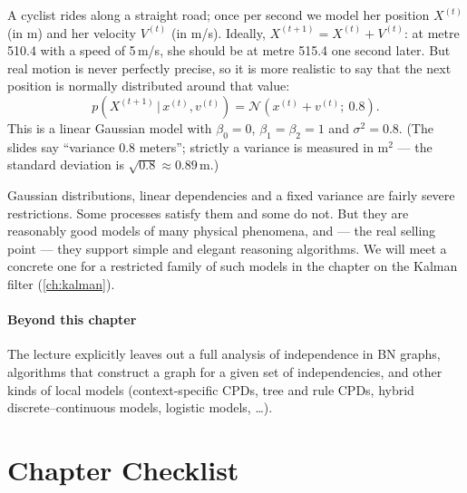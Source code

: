 \documentclass[11pt, oneside]{book}
\newcommand{\Prob}{\mathbb{P}}           %
\newcommand{\Normal}{\mathcal{N}}
\newcommand{\given}{\,\vert\,}           %
\let\originalsection\section
\renewcommand{\section}{\Needspace{7\baselineskip}\originalsection}
\begin{document}
\begin{exbox}[title={A bicycle on a straight road}]
A cyclist rides along a straight road; once per second we model her position
$X^{(t)}$ (in m) and her velocity $V^{(t)}$ (in m/s). Ideally,
$X^{(t+1)} = X^{(t)} + V^{(t)}$: at metre 510.4 with a speed of 5\,m/s, she
should be at metre 515.4 one second later. But real motion is never perfectly
precise, so it is more realistic to say that the next position is normally
distributed around that value:
\[
p(X^{(t+1)} \given x^{(t)}, v^{(t)}) = \Normal(x^{(t)} + v^{(t)};\ 0.8).
\]
This is a linear Gaussian model with $\beta_0 = 0$, $\beta_1 = \beta_2 = 1$ and
$\sigma^2 = 0.8$. (The slides say ``variance 0.8 meters''; strictly a variance
is measured in m$^2$ --- the standard deviation is $\sqrt{0.8} \approx
0.89$\,m.)
\end{exbox}

Gaussian distributions, linear dependencies and a fixed variance are fairly
severe restrictions. Some processes satisfy them and some do not. But they are
reasonably good models of many physical phenomena, and --- the real selling
point --- they support simple and elegant reasoning algorithms. We will meet
a concrete one for a restricted family of such models in the chapter on the
Kalman filter (\cref{ch:kalman}).

\paragraph{Beyond this chapter} The lecture explicitly leaves out a full
analysis of independence in BN graphs, algorithms that construct a graph for a
given set of independencies, and other kinds of local models (context-specific
CPDs, tree and rule CPDs, hybrid discrete--continuous models, logistic models,
\ldots).

\section{Chapter Checklist}
\end{document}
